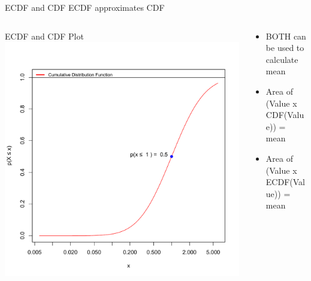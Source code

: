 \documentclass{beamer}
\begin{document}
\begin{frame}{ECDF and CDF}
ECDF approximates CDF	
\begin{columns}    
	\begin{column}{4cm}        
		\begin{center}
		ECDF and CDF Plot           
	 	\includegraphics[width=1.0\textwidth]{Figure4}        
		\end{center}   
	 \end{column}    
	\begin{column}{5cm}        
	  
	\begin{itemize}
	\item BOTH can be used to calculate mean
	\item Area of (Value x CDF(Value)) = mean
	\item Area of (Value x ECDF(Value)) = mean
	\end{itemize}
	\end{column}
	\end{columns}

\end{frame}
\end{document}

